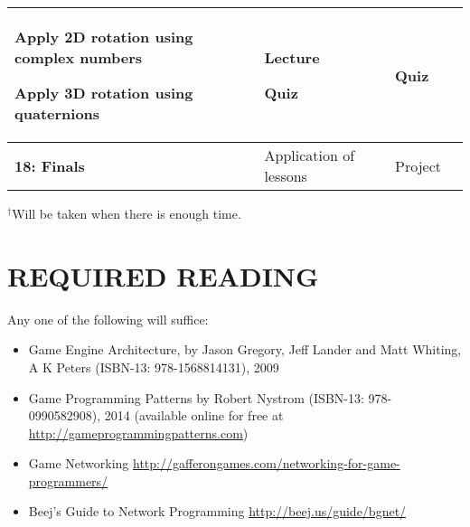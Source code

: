 \documentclass[10pt]{article}
\newenvironment{itemize*}{
\begin{itemize}[leftmargin=1em,noitemsep,nolistsep]
}{\end{itemize}}
\begin{document}
\begin{longtable}{||p{1.8in}|p{2.4in}|p{1.3in}|p{1in}||}
\begin{itemize*}
		\item Apply 2D rotation using complex numbers
		\item Apply 3D rotation using quaternions
	\end{itemize*} &
	\begin{itemize*}
		\item Lecture
		\item Quiz
	\end{itemize*} & Quiz \\ \hline
\textbf{18: Finals} & Application of lessons & Project \\ \hline
\end{longtable}

$^\dagger$Will be taken when there is enough time.

\section{REQUIRED READING}
Any one of the following will suffice:
\begin{itemize}[noitemsep,nolistsep]
\item Game Engine Architecture, by Jason Gregory, Jeff Lander and Matt Whiting, A K Peters (ISBN-13: 978-1568814131), 2009
\item Game Programming Patterns by Robert Nystrom (ISBN-13: 978-0990582908), 2014 (available online for free at \url{http://gameprogrammingpatterns.com})
\item Game Networking \url{http://gafferongames.com/networking-for-game-programmers/}
\item Beej's Guide to Network Programming \url{http://beej.us/guide/bgnet/}
\end{itemize}
\end{document}
